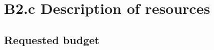 \documentclass[11pt,a4paper]{report}
\newcommand{\eu}[1]{}
\begin{document}





\newpage
\printbibliography

\newrefsection
\newpage
\chapter{B2.c Description of resources}

\eu{Has to be provided online; 8000 chars max (eg 2 pages)}


\section{Requested budget}
\end{document}

